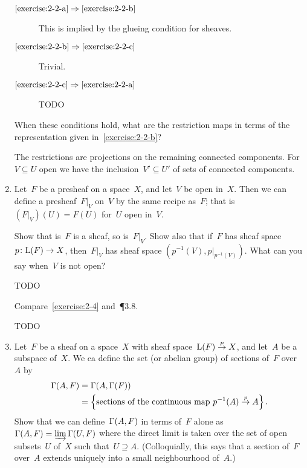 \documentclass[a4paper,11pt]{article}
\begin{document}
\begin{enumerate}
    \begin{solution}
      \begin{description}
        \item[$\ref{exercise:2-2-a}\Rightarrow\ref{exercise:2-2-b}$] This is implied by the glueing condition for sheaves.
        \item[$\ref{exercise:2-2-b}\Rightarrow\ref{exercise:2-2-c}$] Trivial.
        \item[$\ref{exercise:2-2-c}\Rightarrow\ref{exercise:2-2-a}$] TODO
      \end{description}
    \end{solution}

    When these conditions hold, what are the restriction maps in terms of the representation given in~\ref{exercise:2-2-b}?

    \begin{solution}
      The restrictions are projections on the remaining connected components. For~$V\subseteq U$ open we have the inclusion~$V'\subseteq U'$ of sets of connected components.
    \end{solution}

  \item Let~$F$ be a presheaf on a space~$X$, and let~$V$ be open in~$X$. Then we can define a presheaf~$F|_V$ on~$V$ by the same recipe as~$F$; that is~$(F|_V)(U)=F(U)$ for~$U$ open in~$V$.

    Show that is~$F$ is a sheaf, so is~$F|_V$. Show also that if~$F$ has sheaf space~$p\colon \mathrm{L}(F)\to X$, then~$F|_V$ has sheaf space $(p^{-1}(V),p|_{p^{-1}(V)})$. What can you say when~$V$ is not open?

    \begin{solution}
      TODO
    \end{solution}

    Compare~\ref{exercise:2-4} and~\P3.8.

    \begin{solution}
      TODO
    \end{solution}

  \item Let~$F$ be a sheaf on a space~$X$ with sheaf space~$\mathrm{L}(F)\overset{p}{\rightarrow} X$, and let~$A$ be a subspace of~$X$. We ca define the set (or abelian group) of sections of~$F$ over~$A$ by
    \begin{align}
      \mathrm{\Gamma}(A,F)&=\mathrm{\Gamma}(A,\mathrm{\Gamma}(F)) \\
      &=\left\{ \text{sections of the continuous map $p^{-1}(A)\overset{p}{\rightarrow}A$} \right\}.
    \end{align}
    Show that we can define~$\mathrm{\Gamma}(A,F)$ in terms of~$F$ alone as~$\mathrm{\Gamma}(A,F)=\varinjlim\mathrm{\Gamma}(U,F)$ where the direct limit is taken over the set of open subsets~$U$ of~$X$ such that~$U\supseteq A$. (Colloquially, this says that a section of~$F$ over~$A$ extends uniquely into a small neighbourhood of~$A$.)


\end{enumerate}
\end{document}
